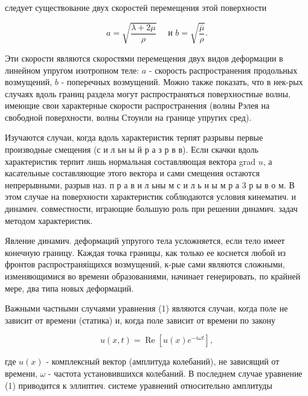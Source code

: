 \documentclass[10pt]{article}
\begin{document}
следует существование двух скоростей перемещения этой поверхности



\[

a=\sqrt{\frac{\lambda+2 \mu}{\rho}} \quad \text { и } b=\sqrt{\frac{\bar{\mu}}{\rho}} .

\]



Эти скорости являются скоростями перемещения двух видов деформации в линейном упругом изотропном теле: $a$ - скорость распространения продольных возмущений, $b$ - поперечных возмущений. Можно также показать, что в нек-рых случаях вдоль границ раздела могут распространяться поверхностные волны, имеющие свои характерные скорости распространения (волны Рэлея на свободной поверхности, волны Стоунли на границе упругих сред).



Изучаются случаи, когда вдоль характеристик терпят разрывы первые производные смещения (с и л ьн ы й р а з р в в). Если скачки вдоль характеристик терпит лишь нормальная составляющая вектора grad $u$, а касательные составляющие этого вектора и сами смещения остаются непрерывными, разрыв наз. п р а в и л ьны м с и л ь н ы м р а 3 р ы в о м. В этом случае на поверхности характеристик соблюдаются условия кинематич. и динамич. совместности, играющие большую роль при решении динамич. задач методом характеристик.



Явление динамич. деформаций упругого тела усложняется, если тело имеет конечную границу. Каждая точка границы, как только ее коснется любой из фронтов распространяіщихся возмущений, к-рые сами являются сложными, изменяющимися во времени образованиями, начинает генерировать, по крайней мере, два типа новых деформаций.



Важными частными случаями уравнения (1) являются случаи, когда поле не зависит от времени (статика) и, когда поле зависит от времени по закону



\[

u(x, t)=\operatorname{Re}\left[u(x) e^{-i \omega t}\right],

\]



где $u(x)$ - комплексный вектор (амплитуда колебаний), не зависящий от времени, $\omega$ - частота установившихся колебаний. В последнем случае уравнение (1) приводится к эллиптич. системе уравнений относительно амплитуды
\end{document}
